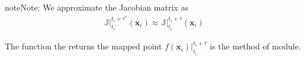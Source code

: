\documentclass[letterpaper,10pt,english,openany,oneside]{sphinxmanual}
\begin{document}
\begin{sphinxadmonition}{note}{Note:}
We approximate the Jacobian matrix as
\begin{equation*}
\begin{split}\mathbb{J} \big \rvert_{t_{i}}^{t_{i}+\tau^{*}}(\mathbf{x}_i) \approx  \mathbb{J} \big \rvert_{t_{i}}^{t_{i}+\overline{\tau}}(\mathbf{x}_i)\end{split}
\end{equation*}\end{sphinxadmonition}

The function the returns the mapped point \(f(\mathbf{x}_i)  \big \rvert_{t_{i}}^{t_{i}+\overline{\tau}}\) is the  method of  module.

 
\end{document}
